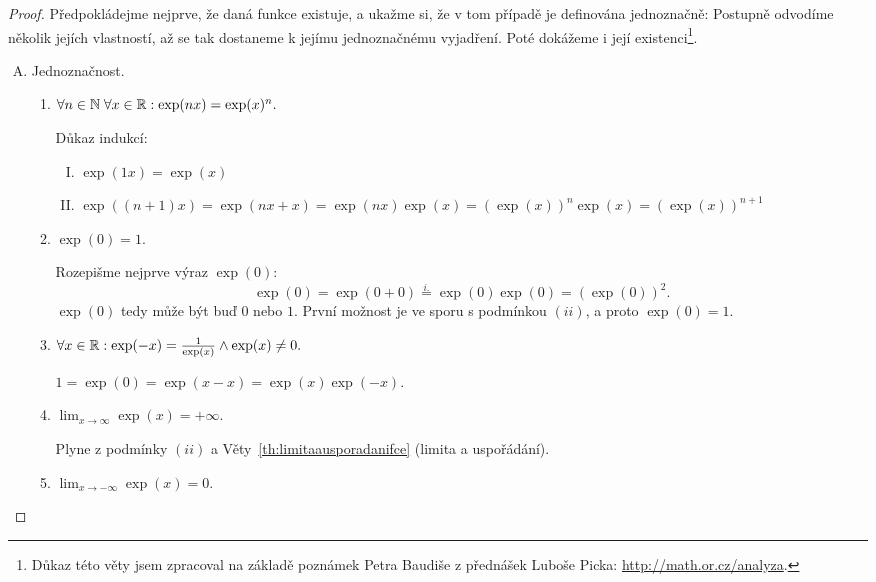 \begin{proof}
    Předpokládejme nejprve, že daná funkce existuje, a ukažme si, že v tom případě
    je definována jednoznačně: Postupně odvodíme několik jejích vlastností, až se
    tak dostaneme k jejímu jednoznačnému vyjadření. Poté dokážeme i její 
    existenci\footnote{Důkaz této věty jsem zpracoval na základě 
    poznámek Petra Baudiše z přednášek Luboše Picka: \url{http://math.or.cz/analyza}.}.

    \begin{enumerate}[A.]
        \item Jednoznačnost.

            \begin{enumerate}[1.]
                \item $\forall n \in \mathbb{N} \; \forall x \in \mathbb{R}: \exp(nx) = \exp(x)^n.$

                    Důkaz indukcí:
                    \begin{enumerate}[I.]
                        \item $\exp(1x) = \exp(x)$
                        \item $\exp((n+1)x) = \exp(nx + x) = \exp(nx)\exp(x) = (\exp(x))^n
                            \exp(x) = (\exp(x))^{n+1}$
                    \end{enumerate}

                \item $\exp(0) = 1.$
                    
                    Rozepišme nejprve výraz $\exp(0)$:
                    $$\exp(0) = \exp(0 + 0) \stackrel{i.}{=} \exp(0)\exp(0) = (\exp(0))^2.$$
                    $\exp(0)$ tedy může být buď $0$ nebo $1$. První možnost je 
                    ve sporu s podmínkou $(ii)$, a proto $\exp(0) = 1.$

                \item $\forall x \in \mathbb{R}: \exp(-x) = \frac{1}{\exp(x)} \land \exp(x) \neq 0.$

                    $1 = \exp(0) = \exp(x-x) = \exp(x)\exp(-x).$

                \item $\lim_{x \to \infty} \exp(x) = +\infty.$

                    Plyne z podmínky $(ii)$ a Věty~\ref{th:limitaausporadanifce} (limita a 
                    uspořádání).

                \item $\lim_{x \to -\infty} \exp(x) = 0.$


\end{enumerate}
\end{enumerate}
\end{proof}
